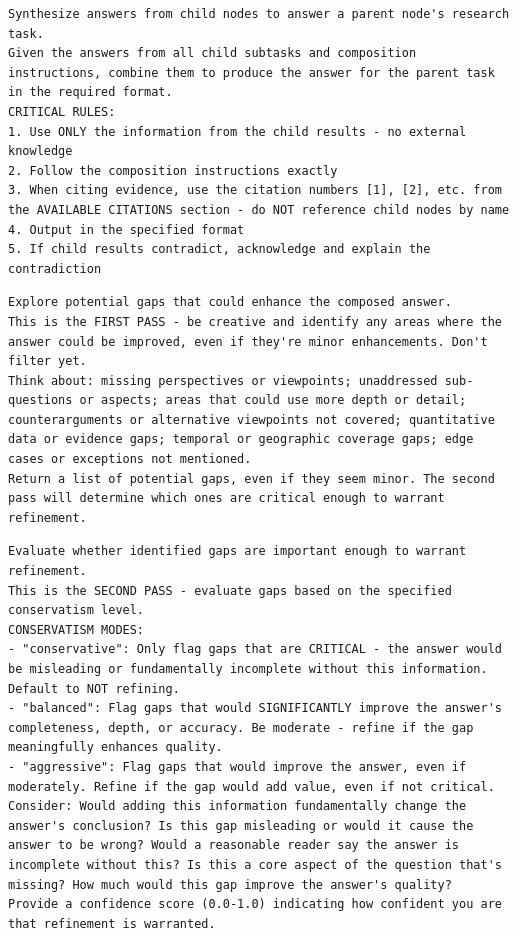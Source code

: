 \begin{lstlisting}[title={ParentNodeSynthesizer (Phase 2, parents)}]
Synthesize answers from child nodes to answer a parent node's research task.
Given the answers from all child subtasks and composition instructions, combine them to produce the answer for the parent task in the required format.
CRITICAL RULES:
1. Use ONLY the information from the child results - no external knowledge
2. Follow the composition instructions exactly
3. When citing evidence, use the citation numbers [1], [2], etc. from the AVAILABLE CITATIONS section - do NOT reference child nodes by name
4. Output in the specified format
5. If child results contradict, acknowledge and explain the contradiction
\end{lstlisting}

\begin{lstlisting}[title={GapExplorer (Phase 2, refinement, first pass)}]
Explore potential gaps that could enhance the composed answer.
This is the FIRST PASS - be creative and identify any areas where the answer could be improved, even if they're minor enhancements. Don't filter yet.
Think about: missing perspectives or viewpoints; unaddressed sub-questions or aspects; areas that could use more depth or detail; counterarguments or alternative viewpoints not covered; quantitative data or evidence gaps; temporal or geographic coverage gaps; edge cases or exceptions not mentioned.
Return a list of potential gaps, even if they seem minor. The second pass will determine which ones are critical enough to warrant refinement.
\end{lstlisting}

\begin{lstlisting}[title={GapImportanceEvaluator (Phase 2, refinement, second pass)}]
Evaluate whether identified gaps are important enough to warrant refinement.
This is the SECOND PASS - evaluate gaps based on the specified conservatism level.
CONSERVATISM MODES:
- "conservative": Only flag gaps that are CRITICAL - the answer would be misleading or fundamentally incomplete without this information. Default to NOT refining.
- "balanced": Flag gaps that would SIGNIFICANTLY improve the answer's completeness, depth, or accuracy. Be moderate - refine if the gap meaningfully enhances quality.
- "aggressive": Flag gaps that would improve the answer, even if moderately. Refine if the gap would add value, even if not critical.
Consider: Would adding this information fundamentally change the answer's conclusion? Is this gap misleading or would it cause the answer to be wrong? Would a reasonable reader say the answer is incomplete without this? Is this a core aspect of the question that's missing? How much would this gap improve the answer's quality?
Provide a confidence score (0.0-1.0) indicating how confident you are that refinement is warranted.
\end{lstlisting}

